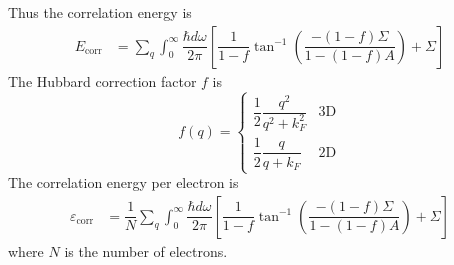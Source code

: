 \documentclass[aps,prb,onecolumn,notitlepage,showpacs,floatfix,superscriptaddress]{revtex4-1}
\begin{document}
Thus the correlation energy is
\begin{equation}
\begin{split}
E_{\mathrm{corr}}&=\sum_{q} \int_{0}^{\infty} \dfrac{\hbar d\omega}{2\pi} \left[ \dfrac{1}{1-f} \tan^{-1} \left(\dfrac{-(1-f) \Sigma}{1-(1-f) A} \right)+ \Sigma \right] 
\end{split}
\end{equation} 
The Hubbard correction factor $f$ is
\begin{equation*} 
f(q)=\begin{cases}
\dfrac{1}{2}\dfrac{q^2}{q^2+k_{F}^{2}} &\text{3D} \\
\dfrac{1}{2}\dfrac{q}{q+k_{F}} &\text{2D} 
\end{cases} 
\end{equation*}
The correlation energy per electron is 
\begin{equation}
\begin{split}
\varepsilon_\mathrm{corr}&=\dfrac{1}{N}\sum_{q} \int_{0}^{\infty} \dfrac{\hbar d\omega}{2\pi} \left[ \dfrac{1}{1-f} \tan^{-1} \left(\dfrac{-(1-f) \Sigma}{1-(1-f) A} \right)+ \Sigma \right] 
\end{split}
\end{equation}
where $N$ is the number of electrons.
\end{document}
